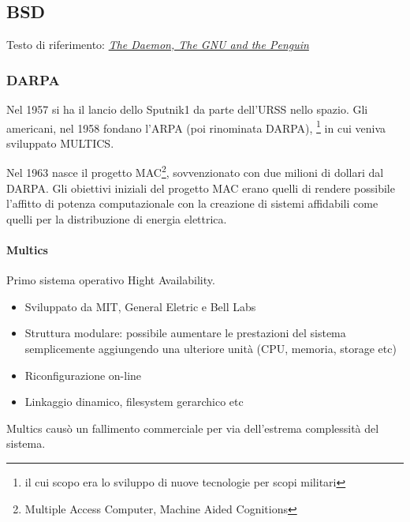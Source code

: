 \subsection{BSD}

Testo di riferimento: \href{http://www.groklaw.net/staticpages/index.php?page=20051013231901859}{\textit{The Daemon, The GNU and the Penguin}}

\subsubsection{DARPA}

Nel 1957 si ha il lancio dello Sputnik1 da parte dell'URSS nello spazio. Gli americani, nel 1958 fondano l'ARPA (poi rinominata DARPA), \footnote{il cui scopo era lo sviluppo di nuove tecnologie per scopi militari} in cui veniva sviluppato MULTICS.

Nel 1963 nasce il progetto MAC\footnote{Multiple Access Computer, Machine Aided Cognitions}, sovvenzionato con due milioni di dollari dal DARPA. Gli obiettivi iniziali del progetto MAC erano quelli di rendere possibile l'affitto di potenza computazionale con la creazione di sistemi affidabili come quelli per la distribuzione di energia elettrica.

\paragraph*{Multics} Primo sistema operativo Hight Availability. \begin{itemize}

\item Sviluppato da MIT, General Eletric e Bell Labs
\item Struttura modulare: possibile aumentare le prestazioni del sistema semplicemente aggiungendo una ulteriore unit\`a (CPU, memoria, storage etc)
\item Riconfigurazione on-line
\item Linkaggio dinamico, filesystem gerarchico etc

\end{itemize}

Multics caus\`o un fallimento commerciale per via dell'estrema complessit\`a del sistema.

